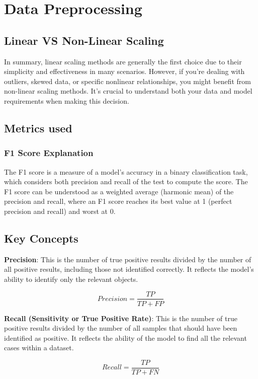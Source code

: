 \section{Data Preprocessing}

\subsection{Linear VS Non-Linear Scaling}
In summary, linear scaling methods are generally the first choice due to their simplicity and effectiveness in many scenarios. However, if you're dealing with outliers, skewed data, or specific nonlinear relationships, you might benefit from non-linear scaling methods. It's crucial to understand both your data and model requirements when making this decision.

\subsection{Metrics used}

\subsubsection*{F1 Score Explanation}

The F1 score is a measure of a model's accuracy in a binary classification task, which considers both precision and recall of the test to compute the score. The F1 score can be understood as a weighted average (harmonic mean) of the precision and recall, where an F1 score reaches its best value at 1 (perfect precision and recall) and worst at 0.

\subsection*{Key Concepts}

\textbf{Precision}: This is the number of true positive results divided by the number of all positive results, including those not identified correctly. It reflects the model's ability to identify only the relevant objects.

\[
    Precision = \frac{TP}{TP + FP}
\]

\textbf{Recall (Sensitivity or True Positive Rate)}: This is the number of true positive results divided by the number of all samples that should have been identified as positive. It reflects the ability of the model to find all the relevant cases within a dataset.

\[
    Recall = \frac{TP}{TP + FN}
\]


